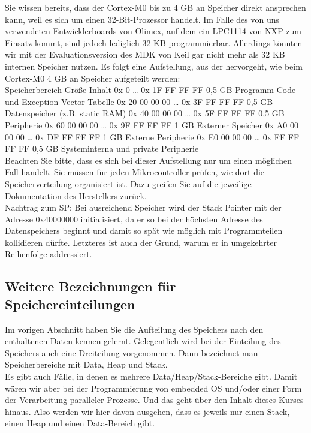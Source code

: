 Sie wissen bereits, dass der Cortex-M0 bis zu 4 GB an Speicher direkt ansprechen kann, weil es sich um einen 32-Bit-Prozessor handelt. Im Falle des von uns verwendeten Entwicklerboards von Olimex, auf dem ein LPC1114 von NXP zum Einsatz kommt, sind jedoch lediglich 32 KB programmierbar. Allerdings könnten wir mit der Evaluationsversion des MDK von Keil gar nicht mehr als 32 KB internen Speicher nutzen. Es folgt eine Aufstellung, aus der hervorgeht, wie beim Cortex-M0 4 GB an Speicher aufgeteilt werden:\\

Speicherbereich	Größe	Inhalt
0x 0 … 0x 1F FF FF FF	0,5 GB	Programm Code und Exception Vector Tabelle
0x 20 00 00 00 … 0x 3F FF FF FF	0,5 GB	Datenspeicher (z.B. static RAM)
0x 40 00 00 00 … 0x 5F FF FF FF	0,5 GB	Peripherie
0x 60 00 00 00 … 0x 9F FF FF FF	1 GB	Externer Speicher
0x A0 00 00 00 … 0x DF FF FF FF	1 GB	Externe Peripherie
0x E0 00 00 00 … 0x FF FF FF FF	0,5 GB	Systeminterna und private Peripherie\\


Beachten Sie bitte, dass es sich bei dieser Aufstellung nur um einen möglichen Fall handelt. Sie müssen für jeden Mikrocontroller prüfen, wie dort die Speicherverteilung organisiert ist. Dazu greifen Sie auf die jeweilige Dokumentation des Herstellers zurück.\\

Nachtrag zum SP: Bei ausreichend Speicher wird der Stack Pointer mit der Adresse 0x40000000 initialisiert, da er so bei der höchsten Adresse des Datenspeichers beginnt und damit so spät wie möglich mit Programmteilen kollidieren dürfte. Letzteres ist auch der Grund, warum er in umgekehrter Reihenfolge addressiert.

\subsection{Weitere Bezeichnungen für Speichereinteilungen}

Im vorigen Abschnitt haben Sie die Aufteilung des Speichers nach den enthaltenen Daten kennen gelernt. Gelegentlich wird bei der Einteilung des Speichers auch eine Dreiteilung vorgenommen. Dann bezeichnet man Speicherbereiche mit Data, Heap und Stack.\\

Es gibt auch Fälle, in denen es mehrere Data/Heap/Stack-Bereiche gibt. Damit wären wir aber bei der Programmierung von embedded OS und/oder einer Form der Verarbeitung paralleler Prozesse. Und das geht über den Inhalt dieses Kurses hinaus. Also werden wir hier davon ausgehen, dass es jeweils nur einen Stack, einen Heap und einen Data-Bereich gibt.\\

